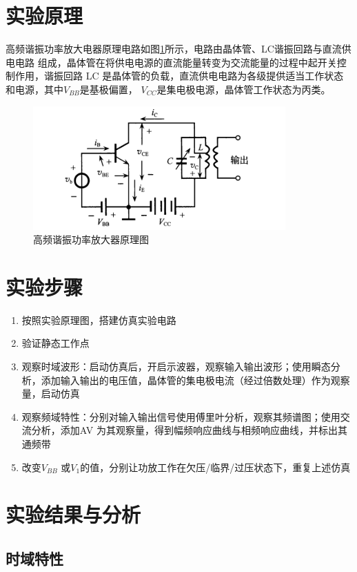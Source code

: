 \documentclass[UTF8]{ctexart}
\begin{document}
\section{实验原理}
高频谐振功率放大电器原理电路如图\ref{img:1}所示，电路由晶体管、LC谐振回路与直流供电电路
组成，晶体管在将供电电源的直流能量转变为交流能量的过程中起开关控制作用，谐振回路
LC 是晶体管的负载，直流供电电路为各级提供适当工作状态和电源，其中$V_{BB}$是基极偏置，
$V_{CC}$是集电极电源，晶体管工作状态为丙类。
\begin{figure}[htbp]
    \centering
    \includegraphics{1.png}
    \caption{高频谐振功率放大器原理图}
    \label{img:1}
\end{figure}
\section{实验步骤}
\begin{enumerate}
    \item 按照实验原理图，搭建仿真实验电路
    \item 验证静态工作点
    \item 观察时域波形：启动仿真后，开启示波器，观察输入输出波形；使用瞬态分析，添加输入输出的电压值，晶体管的集电极电流（经过倍数处理）作为观察量，启动仿真
    \item 观察频域特性：分别对输入输出信号使用傅里叶分析，观察其频谱图；使用交流分析，添加AV 为其观察量，得到幅频响应曲线与相频响应曲线，并标出其通频带
    \item 改变$V_{BB}$ 或$V_1$的值，分别让功放工作在欠压/临界/过压状态下，重复上述仿真
\end{enumerate}
\section{实验结果与分析}
\subsection{时域特性}
\end{document}
